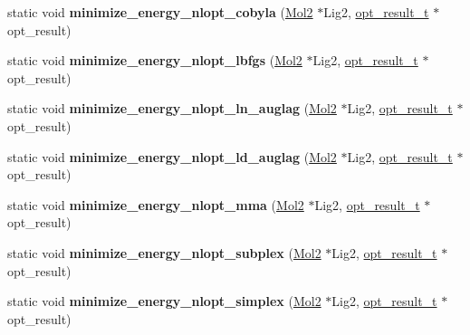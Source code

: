 \begin{DoxyCompactItemize}
\item 
\hypertarget{classOptimizer_ac7cbc77ff69b9b85661cbb0a36b86958}{
static void {\bfseries minimize\_\-energy\_\-nlopt\_\-cobyla} (\hyperlink{classMol2}{Mol2} $\ast$Lig2, \hyperlink{structOptimizer_1_1opt__result__t}{opt\_\-result\_\-t} $\ast$opt\_\-result)}
\label{classOptimizer_ac7cbc77ff69b9b85661cbb0a36b86958}

\item 
\hypertarget{classOptimizer_a015f83dc4f7c75c6a9090a4bc6c8dbb1}{
static void {\bfseries minimize\_\-energy\_\-nlopt\_\-lbfgs} (\hyperlink{classMol2}{Mol2} $\ast$Lig2, \hyperlink{structOptimizer_1_1opt__result__t}{opt\_\-result\_\-t} $\ast$opt\_\-result)}
\label{classOptimizer_a015f83dc4f7c75c6a9090a4bc6c8dbb1}

\item 
\hypertarget{classOptimizer_a110f1d6756a09b2b76ed1ba2f0c6f009}{
static void {\bfseries minimize\_\-energy\_\-nlopt\_\-ln\_\-auglag} (\hyperlink{classMol2}{Mol2} $\ast$Lig2, \hyperlink{structOptimizer_1_1opt__result__t}{opt\_\-result\_\-t} $\ast$opt\_\-result)}
\label{classOptimizer_a110f1d6756a09b2b76ed1ba2f0c6f009}

\item 
\hypertarget{classOptimizer_abc8ea7108444e73d66b0670ea445c123}{
static void {\bfseries minimize\_\-energy\_\-nlopt\_\-ld\_\-auglag} (\hyperlink{classMol2}{Mol2} $\ast$Lig2, \hyperlink{structOptimizer_1_1opt__result__t}{opt\_\-result\_\-t} $\ast$opt\_\-result)}
\label{classOptimizer_abc8ea7108444e73d66b0670ea445c123}

\item 
\hypertarget{classOptimizer_a38cf97bda91286c13574f6596d6252ed}{
static void {\bfseries minimize\_\-energy\_\-nlopt\_\-mma} (\hyperlink{classMol2}{Mol2} $\ast$Lig2, \hyperlink{structOptimizer_1_1opt__result__t}{opt\_\-result\_\-t} $\ast$opt\_\-result)}
\label{classOptimizer_a38cf97bda91286c13574f6596d6252ed}

\item 
\hypertarget{classOptimizer_a3ef39df8f990aff28897d5f764be4610}{
static void {\bfseries minimize\_\-energy\_\-nlopt\_\-subplex} (\hyperlink{classMol2}{Mol2} $\ast$Lig2, \hyperlink{structOptimizer_1_1opt__result__t}{opt\_\-result\_\-t} $\ast$opt\_\-result)}
\label{classOptimizer_a3ef39df8f990aff28897d5f764be4610}

\item 
\hypertarget{classOptimizer_ab1c44ef3185fdc7a3a1560354e6524d6}{
static void {\bfseries minimize\_\-energy\_\-nlopt\_\-simplex} (\hyperlink{classMol2}{Mol2} $\ast$Lig2, \hyperlink{structOptimizer_1_1opt__result__t}{opt\_\-result\_\-t} $\ast$opt\_\-result)}
\label{classOptimizer_ab1c44ef3185fdc7a3a1560354e6524d6}


\end{DoxyCompactItemize}
